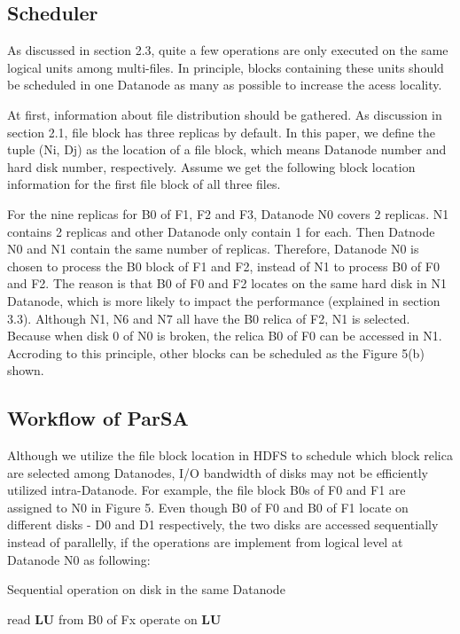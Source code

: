 \documentclass[preprint,12pt]{elsarticle}
\begin{document}
\subsection{Scheduler}
As discussed in section 2.3, quite a few operations are only executed on the same logical units among multi-files. In principle, blocks 
containing these units should be scheduled in one Datanode as many as possible to increase the acess locality. \par
At first, information about file distribution should be gathered. As discussion in section 2.1, file block has three replicas by default. 
In this paper, we define the tuple (Ni, Dj) as the location of a file block, which means Datanode number and hard disk number, respectively. 
Assume we get the following block location information for the first file block of all three files. \par
For the nine replicas for B0 of F1, F2 and F3, Datanode N0 covers 2 replicas. N1 contains 2 replicas and other Datanode only contain 1 for 
each. Then Datnode N0 and N1 contain the same number of replicas. Therefore, Datanode N0 is chosen to process the B0 block of F1 and F2,
instead of N1 to process B0 of F0 and F2. The reason is that B0 of F0 and F2 locates on the same hard disk in N1 Datanode, which is more 
likely to impact the performance (explained in section 3.3). Although N1, N6 and N7 all have the B0 relica of F2, N1 is selected. 
Because when disk 0 of N0 is broken, the relica B0 of F0 can be accessed in N1. Accroding to this principle, other blocks can be scheduled
as the Figure 5(b) shown.

\subsection{Workflow of ParSA}
Although we utilize the file block location in HDFS to schedule which block relica are selected among Datanodes, I/O bandwidth of disks may 
not be efficiently utilized intra-Datanode. For example, the file block B0s of F0 and F1 are assigned to N0 in Figure 5. Even though B0 of 
F0 and B0 of F1 locate on different disks - D0 and D1 respectively, the two disks are accessed sequentially instead of parallelly, if the
operations are implement from logical level at Datanode N0 as following:

\begin{algorithm}[htb]
\caption{Sequential operation on disk in the same Datanode} 
\label{alg:sequential-operation}
\begin{algorithmic}
\STATE read \textbf{LU} from B0 of Fx
\STATE operate on \textbf{LU} 
\ENDFOR
\ENDFOR
\end{algorithmic}
\end{algorithm}
\end{document}
